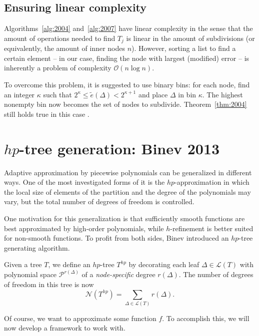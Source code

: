 \documentclass[11pt]{report}
\theoremstyle{definition}
\theoremstyle{remark}
\renewcommand{\L}{\mathcal{L}}
\newcommand{\cN}{\mathcal{N}}
\renewcommand{\O}{\mathcal{O}}
\renewcommand{\P}{\mathcal{P}}
\newcommand{\node}{\Delta}
\newcommand{\te}{\tilde e}
\begin{document}
\subsection{Ensuring linear complexity}
Algorithms~\ref{alg:2004} and~\ref{alg:2007} have linear complexity in the sense that the amount of operations needed to find $T_j$ is linear in the amount of subdivisions (or equivalently, the amount of inner nodes $n$). However, sorting a list to find a certain element -- in our case, finding the node with largest (modified) error -- is inherently a problem of complexity $\O(n \log n)$. 

To overcome this problem, it is suggested to use binary bins: for each node, find an integer $\kappa$ such that $2^\kappa \leq \te(\node) < 2^{\kappa + 1}$ and place $\node$ in bin $\kappa$. The highest nonempty bin now becomes the set of nodes to subdivide. Theorem~\ref{thm:2004} still holds true in this case \cite[p.~207]{2004}.

\section{$hp$-tree generation: Binev 2013}
Adaptive approximation by piecewise polynomials can be generalized in different ways. One of the most investigated forms of it is the $hp$-approximation in which the local size of elements of the partition and the degree of the polynomials may vary, but the total number of degrees of freedom is controlled.

One motivation for this generalization is that sufficiently smooth functions are best approximated by high-order polynomials, while $h$-refinement is better suited for non-smooth functions.  To profit from both sides, Binev introduced an $hp$-tree generating algorithm.

Given a tree $T$, we define an $hp$-tree $T^{hp}$ by decorating each leaf $\node \in \L(T)$ with polynomial space $\P^{r(\node)}$ of a \emph{node-specific} degree $r(\node)$. The number of degrees of freedom in this tree is now
\[
  \cN(T^{hp}) = \sum_{\node \in \L(T)} r(\node).
\]

Of course, we want to approximate some function $f$. To accomplish this, we will now develop a framework to work with.
\end{document}
